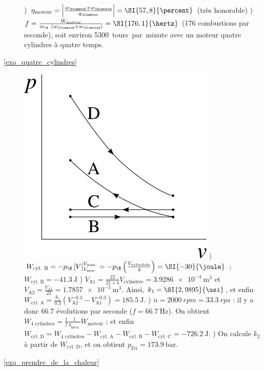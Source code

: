 \begin{description}
					) $\eta_{\text{moteur}} = \left|\frac{w_\fromatob + w_\fromctod}{q_\frombtoc}\right| = \SI{57,8}{\percent}$ (très honorable)
					) $f = \frac{\dot W_{\text{moteur}}}{m_\A \ (w_\fromatob + w_\fromctod)} = \SI{176,1}{\hertz}$ (176 combustions par seconde), soit environ \SI{5300}{tours par minute} avec un moteur quatre cylindres à quatre temps.
	\item [\ref{exo_quatre_cylindres}]
					\includegraphics[width=\solutiondiagramwidth]{images/exo_sol_pv_quatre_cylindres.png}
					) $W_{\text{cyl. B}} = -p_\B \left[V\right]_{V_\text{min.}}^{V_\text{max.}} = - p_\B \left(\frac{V_\text{cylindrée}}{4}\right) = \SI{-30}{\joule}$ ; $W_{\text{cyl. B}} =  \SI{-41,3}{\joule}$
					) $V_\text{A1} = \frac{22}{21\times4}V_\text{cylindrée} = \SI{3,9286e-4}{\metre\cubed}$ et $V_\text{A2} = \frac{V_\text{A1}}{22} = \SI{1,7857e-5}{\metre\cubed}$. Ainsi, $k_1 = \SI{2,9895}{\usi}$, et enfin $W_{\text{cyl. A}} = \frac{k_1}{\num{0,3}} \left(V_\text{A2}^{\num{-0,3}} - V_\text{A1}^{\num{-0,3}}\right) = \SI{+185,5}{\joule}$.
					) $\dot n = \SI{2000}{rpm} = \SI{33,3}{rps}$ : il y a donc \num{66,7} évolutions par seconde ($f = \SI{66,7}{\hertz}$). On obtient $W_\text{4 cylindres} = \frac{1}{f} \frac{1}{\eta_\text{méca.}} \dot W_\text{moteur}$ ; et enfin $W_\text{cyl. D} = W_\text{4 cylindres} - W_\text{cyl. A} - W_\text{cyl. B} -W_\text{cyl. C} = \SI{-726,2}{\joule}$.
					) On calcule $k_2$ à partir de $W_\text{cyl. D}$, et on obtient $p_\text{D1} = \SI{173,9}{\bar}$.
	\item [\ref{exo_prendre_de_la_chaleur}]

\end{description}
